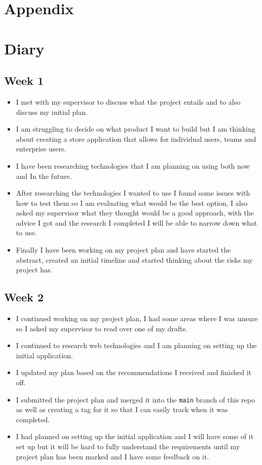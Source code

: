 \documentclass[]{project_report}
\begin{document}



\chapter*{Appendix}


\appendix

\chapter{Diary}

\section{Week 1}
\begin{itemize}
    \item I met with my supervisor to discuss what the project entails and to also discuss my initial plan.
    \item I am struggling to decide on what product I want to build but I am thinking about creating a store application that allows for individual users, teams and enterprise users.
    \item I have been researching technologies that I am planning on using both now and In the future.
    \item After researching the technologies I wanted to use I found some issues with how to test them so I am evaluating what would be the best option, I also asked my supervisor what they thought would be a good approach, with the advice I got and the research I completed I will be able to narrow down what to use.
    \item Finally I have been working on my project plan and have started the abstract, created an initial timeline and started thinking about the risks my project has.
\end{itemize}

\section{Week 2}
\begin{itemize}
    \item I continued working on my project plan, I had some areas where I was unsure so I asked my supervisor to read over one of my drafts.
    \item I continued to research web technologies and I am planning on setting up the initial application.
    \item I updated my plan based on the recommendations I received and finished it off.
    \item I submitted the project plan and merged it into the \texttt{main} branch of this repo as well as creating a tag for it so that I can easily track when it was completed.
    \item I had planned on setting up the initial application and I will have some of it set up but it will be hard to fully understand the requirements until my project plan has been marked and I have some feedback on it.
\end{itemize}
\end{document}
